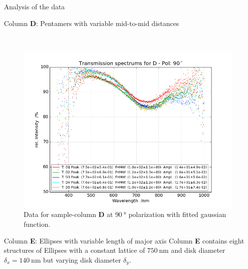 \documentclass[pdftex, a4paper,11pt, twoside, UKenglish]{report}
\begin{document}
\begin{chapter}{Analysis of the data}
\begin{section}{Column \textbf{D}: Pentamers with variable mid-to-mid
        distances}
\begin{figure}[ht!]
\begin{minipage}{.95\textwidth}
          \label{fig:TransspecFIT_DPol0}
        \end{minipage}\\
        \begin{minipage}{.95\textwidth}
          \centering
          \includegraphics[width=\textwidth]
              {Figures/TransspecFIT_DPol90.png}
          \caption{Data for sample-column \textbf{D} at $\SI{90}{\degree}$
              polarization with fitted gaussian function.}
          \label{fig:TransspecFIT_DPol90}
        \end{minipage}
      \end{figure}
      
    \end{section}
    
    
    
    \newpage
    \begin{section}{Column \textbf{E}: Ellipses with variable length of
        major axis}
      \label{chp:DataE}
      Column \textbf{E} contains eight structures of Ellipses with a constant
      lattice of $\SI{750}{\nano\meter}$ and disk diameter
      $\delta_{x} = \SI{140}{\nano\meter}$ but varying disk diameter
      $\delta_{y}$. 


\end{section}
\end{chapter}
\end{document}
